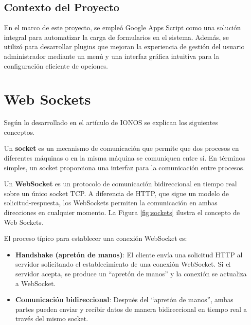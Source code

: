 \subsection{Contexto del Proyecto}

En el marco de este proyecto, se empleó Google Apps Script como una solución integral para automatizar la carga de formularios en el sistema. Además, se utilizó para desarrollar plugins que mejoran la experiencia de gestión del usuario administrador mediante un menú y una interfaz gráfica intuitiva para la configuración eficiente de opciones.



\section{Web Sockets}
Según lo desarrollado en el artículo de IONOS \cite{sockets} se explican los siguientes conceptos.

Un \textbf{socket} es un mecanismo de comunicación que permite que dos procesos en diferentes máquinas o en la misma máquina se comuniquen entre sí. En términos simples, un socket proporciona una interfaz para la comunicación entre procesos.

Un \textbf{WebSocket} es un protocolo de comunicación bidireccional en tiempo real sobre un único socket TCP. A diferencia de HTTP, que sigue un modelo de solicitud-respuesta, los WebSockets permiten la comunicación en ambas direcciones en cualquier momento. La Figura \ref{fig:sockets} ilustra el concepto de Web Sockets.

El proceso típico para establecer una conexión WebSocket es:
\begin{itemize}
\item \textbf{Handshake (apretón de manos)}: El cliente envía una solicitud HTTP al servidor solicitando el establecimiento de una conexión WebSocket. Si el servidor acepta, se produce un “apretón de manos” y la conexión se actualiza a WebSocket.

\item \textbf{Comunicación bidireccional}: Después del “apretón de manos”, ambas partes pueden enviar y recibir datos de manera bidireccional en tiempo real a través del mismo socket.
\end{itemize}

